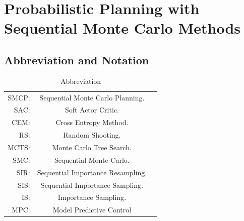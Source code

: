 \chapter{Probabilistic Planning with Sequential Monte Carlo Methods}
\label{app:appendix_smcp}

\section{Abbreviation and Notation}
\label{app:notation}
\begin{table}[H]\caption{Abbreviation}
\begin{center}%
\begin{tabular}{r c p{10cm} }
\toprule
SMCP: & Sequential Monte Carlo Planning.\\
SAC: & Soft Actor Critic.\\
CEM: & Cross Entropy Method.\\
RS: & Random Shooting.\\
MCTS: & Monte Carlo Tree Search.\\
SMC: & Sequential Monte Carlo.\\
SIR: & Sequential Importance Resampling.\\
SIS: & Sequential Importance Sampling.\\
IS: & Importance Sampling.\\
MPC: & Model Predictive Control\\
\bottomrule
\end{tabular}
\end{center}
\label{tab:abbreviation}
\end{table}

